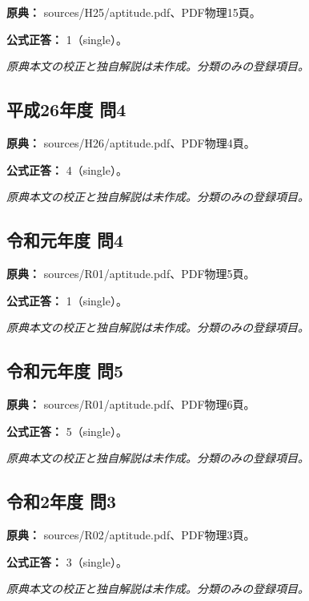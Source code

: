 \noindent\textbf{原典：} sources/H25/aptitude.pdf、PDF物理15頁。

\textbf{公式正答：} 1（single）。

\par\textit{原典本文の校正と独自解説は未作成。分類のみの登録項目。}

\subsection{平成26年度 問4}
\label{q:h26-reg-apt-04}

\noindent\textbf{原典：} sources/H26/aptitude.pdf、PDF物理4頁。

\textbf{公式正答：} 4（single）。

\par\textit{原典本文の校正と独自解説は未作成。分類のみの登録項目。}

\subsection{令和元年度 問4}
\label{q:r01-reg-apt-04}

\noindent\textbf{原典：} sources/R01/aptitude.pdf、PDF物理5頁。

\textbf{公式正答：} 1（single）。

\par\textit{原典本文の校正と独自解説は未作成。分類のみの登録項目。}

\subsection{令和元年度 問5}
\label{q:r01-reg-apt-05}

\noindent\textbf{原典：} sources/R01/aptitude.pdf、PDF物理6頁。

\textbf{公式正答：} 5（single）。

\par\textit{原典本文の校正と独自解説は未作成。分類のみの登録項目。}

\subsection{令和2年度 問3}
\label{q:r02-reg-apt-03}

\noindent\textbf{原典：} sources/R02/aptitude.pdf、PDF物理3頁。

\textbf{公式正答：} 3（single）。

\par\textit{原典本文の校正と独自解説は未作成。分類のみの登録項目。}

